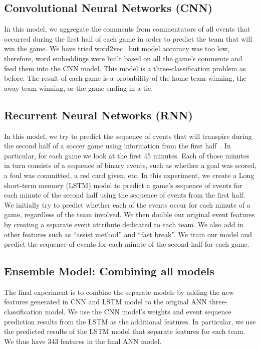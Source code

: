 \documentclass[11pt,a4paper]{article}
\begin{document}
\subsection{Convolutional Neural Networks (CNN)}

In this model, we aggregate the comments from commentators of all events that occurred during the first half of each game in order to predict the team that will win the game. We have tried word2vec~\cite{mikolov2013efficient} but model accuracy was too low, therefore, word embeddings were built based on all the game’s comments and feed them into the CNN model. This model is a three-classification problem as before. The result of each game is a probability of the home team winning, the away team winning, or the game ending in a tie.

\subsection{Recurrent Neural Networks (RNN)}

In this model, we try to predict the sequence of events that will transpire during the second half of a soccer game using information from the first half~\cite{sutskever2014sequence}. In particular, for each game we look at the first 45 minutes. Each of those minutes in turn consists of a sequence of binary events, such as whether a goal was scored, a foul was committed, a red card given, etc. In this experiment, we create a Long short-term memory (LSTM) model to predict a game’s sequence of events for each minute of the second half using the sequence of events from the first half. We initially try to predict whether each of the events occur for each minute of a game, regardless of the team involved. We then double our original event features by creating a separate event attribute dedicated to each team. We also add in other features such as “assist method” and “fast break”. We train our model and predict the sequence of events for each minute of the second half for each game.

\subsection{Ensemble Model: Combining all models}

The final experiment is to combine the separate models by adding the new features generated in CNN and LSTM model to the original ANN three-classification model. We use the CNN model’s weights and event sequence prediction results from the LSTM as the additional features. In particular, we use the predicted results of the LSTM model that separate features for each team. We thus have 343 features in the final ANN model.
\end{document}
